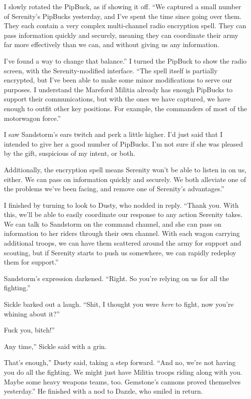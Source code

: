 I slowly rotated the PipBuck, as if showing it off. “We captured a small number of Serenity’s PipBucks yesterday, and I’ve spent the time since going over them. They each contain a very complex multi-channel radio encryption spell. They can pass information quickly and securely, meaning they can coordinate their army far more effectively than we can, and without giving us any information.

\leavevmode{}I’ve found a way to change that balance.” I turned the PipBuck to show the radio screen, with the Serenity-modified interface. “The spell itself is partially encrypted, but I’ve been able to make some minor modifications to serve our purposes. I understand the Mareford Militia already has enough PipBucks to support their communications, but with the ones we have captured, we have enough to outfit other key positions. For example, the commanders of most of the motorwagon force.”

I saw Sandstorm’s ears twitch and perk a little higher. I’d just said that I intended to give her a good number of PipBucks. I’m not sure if she was pleased by the gift, suspicious of my intent, or both.

\leavevmode{}Additionally, the encryption spell means Serenity won’t be able to listen in on us, either. We can pass on information quickly and securely. We both alleviate one of the problems we’ve been facing, and remove one of Serenity’s advantages.”

I finished by turning to look to Dusty, who nodded in reply. “Thank you. With this, we’ll be able to easily coordinate our response to any action Serenity takes. We can talk to Sandstorm on the command channel, and she can pass on information to her riders through their own channel. With each wagon carrying additional troops, we can have them scattered around the army for support and scouting, but if Serenity starts to push us somewhere, we can rapidly redeploy them for support.”

Sandstorm’s expression darkened. “Right. So you’re relying on us for all the fighting.”

Sickle barked out a laugh. “Shit, I thought you were \textit{here} to fight, now you’re whining about it?”

\leavevmode{}Fuck you, bitch!”

\leavevmode{}Any time,” Sickle said with a grin.

\leavevmode{}That’s enough,” Dusty said, taking a step forward. “And no, we’re not having you do all the fighting. We might just have Militia troops riding along with you. Maybe some heavy weapons teams, too. Gemstone’s cannons proved themselves yesterday.” He finished with a nod to Dazzle, who smiled in return.

